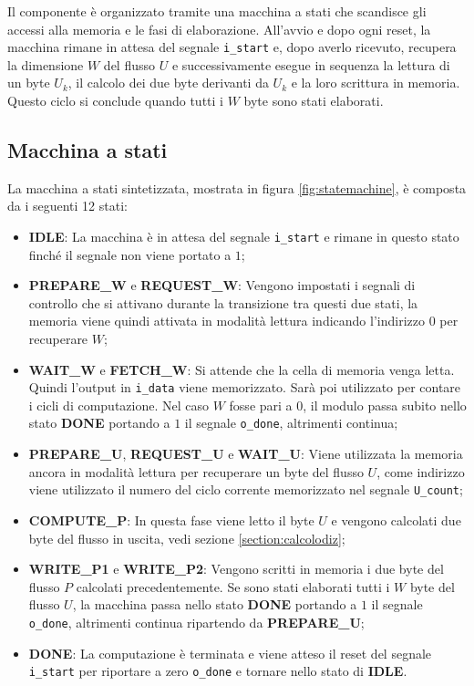 Il componente è organizzato tramite una macchina a stati che scandisce gli accessi alla memoria e le fasi di elaborazione. All'avvio e dopo ogni reset, la macchina rimane in attesa del segnale \verb|i_start| e, dopo averlo ricevuto, recupera la dimensione $W$ del flusso $U$ e successivamente esegue in sequenza la lettura di un byte $U_k$, il calcolo dei due byte derivanti da $U_k$ e la loro scrittura in memoria. Questo ciclo si conclude quando tutti i $W$ byte sono stati elaborati.

\subsection{Macchina a stati}

La macchina a stati sintetizzata, mostrata in figura \ref{fig:statemachine}, è composta da i seguenti 12 stati:

\begin{itemize}
    \item \textbf{IDLE}: La macchina è in attesa del segnale \verb|i_start| e rimane in questo stato finché il segnale non viene portato a $1$;
    \item \textbf{PREPARE\_W} e \textbf{REQUEST\_W}: Vengono impostati i segnali di controllo che si attivano durante la transizione tra questi due stati, la memoria viene quindi attivata in modalità lettura indicando l'indirizzo $0$ per recuperare $W$;
    \item \textbf{WAIT\_W} e \textbf{FETCH\_W}: Si attende che la cella di memoria venga letta. Quindi l'output in \verb|i_data| viene memorizzato. Sarà poi utilizzato per contare i cicli di computazione. Nel caso $W$ fosse pari a $0$, il modulo passa subito nello stato \textbf{DONE} portando a $1$ il segnale \verb|o_done|, altrimenti continua;
    \item \textbf{PREPARE\_U}, \textbf{REQUEST\_U} e \textbf{WAIT\_U}: Viene utilizzata la memoria ancora in modalità lettura per recuperare un byte del flusso $U$, come indirizzo viene utilizzato il numero del ciclo corrente memorizzato nel segnale \verb|U_count|;
    \item \textbf{COMPUTE\_P}: In questa fase viene letto il byte $U$ e vengono calcolati due byte del flusso in uscita, vedi sezione \ref{section:calcolodiz};
    \item \textbf{WRITE\_P1} e \textbf{WRITE\_P2}: Vengono scritti in memoria i due byte del flusso $P$ calcolati precedentemente. Se sono stati elaborati tutti i $W$ byte del flusso $U$, la macchina passa nello stato \textbf{DONE} portando a $1$ il segnale \verb|o_done|, altrimenti continua ripartendo da \textbf{PREPARE\_U};
    \item \textbf{DONE}: La computazione è terminata e viene atteso il reset del segnale \verb|i_start| per riportare a zero \verb|o_done| e tornare nello stato di \textbf{IDLE}.
\end{itemize}

